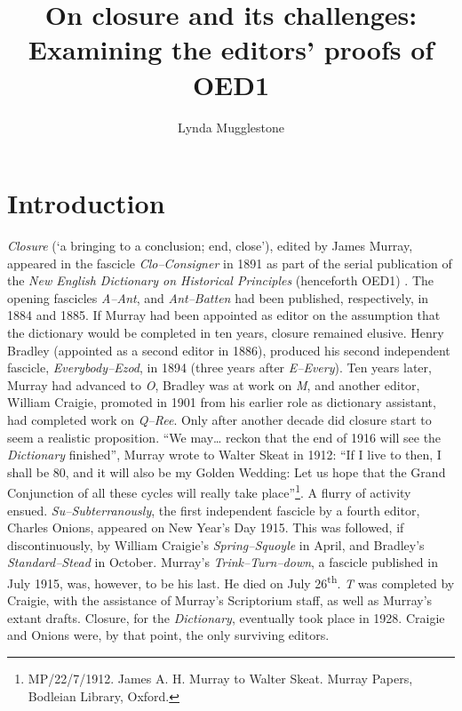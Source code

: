 \documentclass[output=paper,colorlinks,citecolor=brown,arabicfont,chinesefont]{langscibook}
\author{Lynda Mugglestone\affiliation{Pembroke College, University of Oxford}}
\title[Examining the editors’ proofs of OED1]{On closure and its challenges: Examining the editors’ proofs of OED1}
\begin{document}
 
\maketitle

\section{Introduction}

\emph{Closure} (‘a bringing to a conclusion; end, close’), edited by James Murray, appeared in the fascicle \emph{Clo--Consigner} in 1891 as part of the serial publication of the \emph{New English Dictionary on Historical Principles} (henceforth OED1) \citep{Murrayetal1884}. The opening fascicles \emph{A--Ant}, and \emph{Ant--Batten} had been published, respectively, in 1884 and 1885. If Murray had been appointed as editor on the assumption that the dictionary would be completed in ten years, closure remained elusive. Henry Bradley (appointed as a second editor in 1886), produced his second independent fascicle, \emph{Everybody--Ezod}, in 1894 (three years after \emph{E--Every}). Ten years later, Murray had advanced to \emph{O}, Bradley was at work on \emph{M}, and another editor, William Craigie, promoted in 1901 from his earlier role as dictionary assistant, had completed work on \emph{Q--Ree}. Only after another decade did closure start to seem a realistic proposition. “We may… reckon that the end of 1916 will see the \emph{Dictionary} finished”, Murray wrote to Walter Skeat in 1912: “If I live to then, I shall be 80, and it will also be my Golden Wedding: Let us hope that the Grand Conjunction of all these cycles will really take place”\footnote{MP/22/7/1912. James A. H. Murray to Walter Skeat. Murray Papers, Bodleian Library, Oxford.}. A flurry of activity ensued. \emph{Su--Subterranously}, the first independent fascicle by a fourth editor, Charles Onions, appeared on New Year’s Day 1915. This was followed, if discontinuously, by William Craigie’s \emph{Spring--Squoyle} in April, and Bradley’s \emph{Standard--Stead} in October. Murray’s \emph{Trink--Turn--down}, a fascicle published in July 1915,  was, however, to be his last. He died on July 26\textsuperscript{th}. \textit{T} was completed by Craigie, with the assistance of Murray’s Scriptorium staff, as well as Murray’s extant drafts. Closure, for the \emph{Dictionary}, eventually took place in 1928. Craigie and Onions were, by that point, the only surviving editors.
\end{document}
